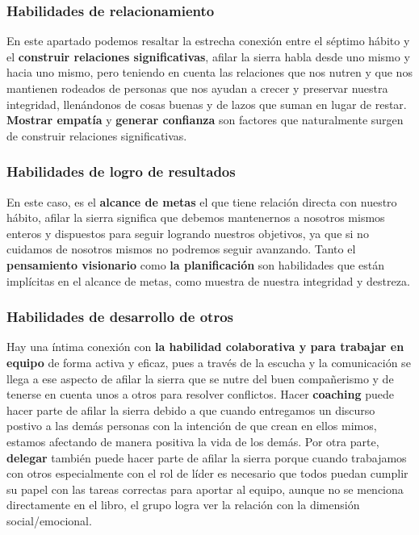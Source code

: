 \documentclass[onecolumn]{article} %
\begin{document}
	\subsubsection{Habilidades de relacionamiento}
	
	En este apartado podemos resaltar la estrecha conexión entre el séptimo hábito y el \textbf{construir relaciones significativas}, afilar la sierra habla desde uno mismo y hacia uno mismo, pero teniendo en cuenta las relaciones que nos nutren y que nos mantienen rodeados de personas que nos ayudan a crecer y preservar nuestra integridad, llenándonos de cosas buenas y de lazos que suman en lugar de restar. \textbf{Mostrar empatía} y \textbf{generar confianza} son factores que naturalmente surgen de construir relaciones significativas.
	
	\subsubsection{Habilidades de logro de resultados}
	
	En este caso, es el \textbf{alcance de metas} el que tiene relación directa con nuestro hábito, afilar la sierra significa que debemos mantenernos a nosotros mismos enteros y dispuestos para seguir logrando nuestros objetivos, ya que si no cuidamos de nosotros mismos no podremos seguir avanzando. Tanto el \textbf{pensamiento visionario} como \textbf{la planificación} son habilidades que están implícitas en el alcance de metas, como muestra de nuestra integridad y destreza. 
	
	\subsubsection{Habilidades de desarrollo de otros}
	
	Hay una íntima conexión con \textbf{la habilidad colaborativa y para trabajar en equipo} de forma activa y eficaz, pues a través de la escucha y la comunicación se llega a ese aspecto de afilar la sierra que se nutre del buen compañerismo y de tenerse en cuenta unos a otros para resolver conflictos. Hacer \textbf{coaching} puede hacer parte de afilar la sierra debido a que cuando entregamos un discurso postivo a las demás personas con la intención de que crean en ellos mimos, estamos afectando de manera positiva la vida de los demás. Por otra parte, \textbf{delegar} también puede hacer parte de afilar la sierra porque cuando trabajamos con otros especialmente con el rol de líder es necesario que todos puedan cumplir su papel con las tareas correctas para aportar al equipo, aunque no se menciona directamente en el libro, el grupo logra ver la relación con la dimensión social/emocional.
	
\end{document}

